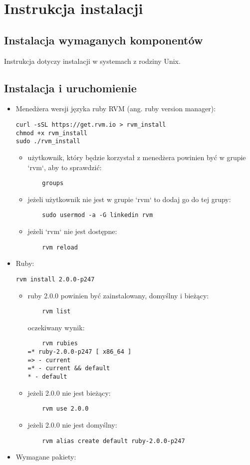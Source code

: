 \chapter{Instrukcja instalacji}
\label{Chapterc1}

\section{Instalacja wymaganych komponentów}
Instrukcja dotyczy instalacji w systemach z rodziny Unix.
\section{Instalacja i uruchomienie}
\begin{itemize}
\item Menedżera wersji języka ruby RVM (ang. ruby version manager):
\begin{verbatim}
curl -sSL https://get.rvm.io > rvm_install
chmod +x rvm_install
sudo ./rvm_install
\end{verbatim}
	\begin{itemize}
	\item użytkownik, który będzie korzystał z menedżera powinien być w 		grupie `rvm`, aby to sprawdzić:
	\begin{verbatim} 
	groups
	\end{verbatim}
	\item jeżeli użytkownik nie jest w grupie `rvm` to dodaj go do tej 			grupy:
	\begin{verbatim}
	sudo usermod -a -G linkedin rvm
	\end{verbatim}
	\item jeżeli `rvm` nie jest dostępne:
	\begin{verbatim}
	rvm reload
	\end{verbatim}
	\end{itemize}
\item Ruby:
\begin{verbatim}
rvm install 2.0.0-p247
\end{verbatim}
	\begin{itemize}
	\item ruby 2.0.0 powinien być zainstalowany, domyślny i bieżący:
	\begin{verbatim}
	rvm list
	\end{verbatim}
	oczekiwany wynik:
	\begin{verbatim}
	rvm rubies
=* ruby-2.0.0-p247 [ x86_64 ]
=> - current
=* - current && default
* - default
	\end{verbatim}
	\item jeżeli 2.0.0 nie jest bieżący:
	\begin{verbatim}
	rvm use 2.0.0
	\end{verbatim}
	\item jeżeli 2.0.0 nie jest domyślny:
	\begin{verbatim}
	rvm alias create default ruby-2.0.0-p247
	\end{verbatim}
	\end{itemize}
\item Wymagane pakiety:


\end{itemize}
